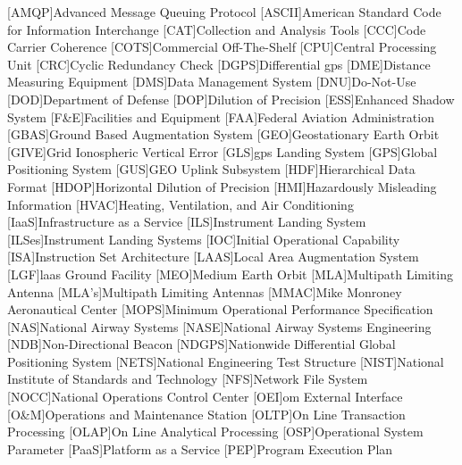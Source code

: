 \begin{acronym}[WAAS]
[AMQP]{Advanced Message Queuing Protocol}
[ASCII]{American Standard Code for Information Interchange}
[CAT]{Collection and Analysis Tools}
[CCC]{Code Carrier Coherence}
[COTS]{Commercial Off-The-Shelf}
[CPU]{Central Processing Unit}
[CRC]{Cyclic Redundancy Check}
[DGPS]{Differential \ac{gps}}
[DME]{Distance Measuring Equipment}
[DMS]{Data Management System}
[DNU]{Do-Not-Use}
[DOD]{Department of Defense}
[DOP]{Dilution of Precision}
[ESS]{Enhanced Shadow System}
[F\&E]{Facilities and Equipment}
[FAA]{Federal Aviation Administration}
[GBAS]{Ground Based Augmentation System}
[GEO]{Geostationary Earth Orbit}
[GIVE]{Grid Ionospheric Vertical Error}
[GLS]{\ac{gps} Landing System}
[GPS]{Global Positioning System}
[GUS]{GEO Uplink Subsystem}
[HDF]{Hierarchical Data Format}
[HDOP]{Horizontal Dilution of Precision}
[HMI]{Hazardously Misleading Information}
[HVAC]{Heating, Ventilation, and Air Conditioning}
[IaaS]{Infrastructure as a Service}
[ILS]{Instrument Landing System}
[ILSes]{Instrument Landing Systems}
[IOC]{Initial Operational Capability}
[ISA]{Instruction Set Architecture}
[LAAS]{Local Area Augmentation System}
[LGF]{\ac{laas} Ground Facility}
[MEO]{Medium Earth Orbit}
[MLA]{Multipath Limiting Antenna}
[MLA's]{Multipath Limiting Antennas}
[MMAC]{Mike Monroney Aeronautical Center}
[MOPS]{Minimum Operational Performance Specification}
[NAS]{National Airway Systems}
[NASE]{National Airway Systems Engineering}
[NDB]{Non-Directional Beacon}
[NDGPS]{Nationwide Differential Global Positioning System}
[NETS]{National Engineering Test Structure}
[NIST]{National Institute of Standards and Technology}
[NFS]{Network File System}
[NOCC]{National Operations Control Center}
[OEI]{\ac{om} External Interface}
[O\&M]{Operations and Maintenance Station}
[OLTP]{On Line Transaction Processing}
[OLAP]{On Line Analytical Processing}
[OSP]{Operational System Parameter}
[PaaS]{Platform as a Service}
[PEP]{Program Execution Plan}

\end{acronym}

